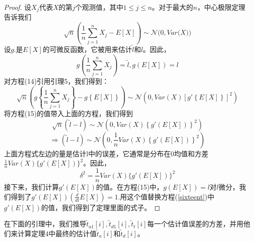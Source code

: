 \documentclass[UTF8]{ctexart}
\newtheorem*{proof}{证明}
\begin{document}
\begin{proof}
设$X_j$代表$X$的第$j$个观测值，其中$1\leq j \leq n$。对于最大的$n$，中心极限定理告诉我们
\begin{equation}
\sqrt{n}\left(\frac{1}{n}\sum_{j=1}^{n}X_j-E[X]\right)\sim\mathcal{N}\Big(0,Var\big(X\big)\Big)
\end{equation}
设$g{.}$是$E[X]$的可微反函数，它被用来估计$\widetilde{l}$和$l$。因此，
\begin{equation}
g\left(\frac{1}{n}\sum_{j=1}^{n}X_j\right)=\widetilde{l}, g\left(E[X]\right)=l
\end{equation}
对方程(14)引用引理5，我们得到：
$$\sqrt{n}\left(g\left\{\frac{1}{n}\sum_{j=1}^{n}X_j\right\}-g\left\{E[X]\right\}\right)\sim\mathcal{N}\left(0,Var\left(X\right)\left[g'\left\{E[X]\right\}\right]^2\right)$$
将方程(15)的值带入上面的方程，我们得到
$$\sqrt{n}\left(\widetilde{l}-l\right)\sim\mathcal{N}\left(0,Var(X)\left\{g'\left(E[X]\right)\right\}^2\right)$$
$$\Rightarrow\left(\widetilde{l}-l\right)\sim\mathcal{N}\left(0,\frac{1}{n}Var(X)\left\{g'\left(E[X]\right)\right\}^2\right)$$
上面方程式左边的量是估计l中的误差，它通常是分布在0均值和方差\\$\frac{1}{n}Var(X)\{g'(E[X])\}^2$。因此，
\begin{equation}\label{sixteent}
\delta^2=\frac{1}{n}Var(X)\{g'(E[X])\}^2
\end{equation}
接下来，我们计算$g'(E[X])$的值。在方程(15)中，$g(E[X])=l$对$l$微分，我们得到了$g'(E[X])(\frac{d}{dl}E[X]) = 1$.用这个值替换方程(\ref{sixteent})中$g'(E[X])$的值，我们得到了定理里面的式子。
\end{proof}
在下面的引理中，我们推导$\widetilde{t}_{a1}[i],\widetilde{t}_{d1}[i],\widetilde{t}_t[i]$每一个估计值误差的方差，并用他们来计算定理4中最终的估计值$\widetilde{t}_a[i]$和$\widetilde{t}_d[i]$。
\end{document}
